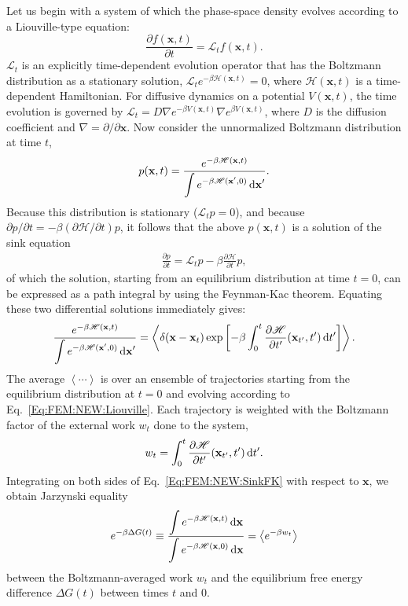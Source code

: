 Let us begin with a system of which the phase-space density evolves according to a Liouville-type equation:
\begin{equation}
	\frac{\partial f(\mathbf{x},t)}{\partial t}=\mathscr{L}_tf(\mathbf{x},t).
	\label{Eq:FEM:NEW:Liouville}
\end{equation}
$\mathscr{L}_t$ is an explicitly time-dependent evolution operator that has the Boltzmann distribution as a stationary solution, $\mathscr{L}_t e^{-\beta \mathscr{H}(\mathbf{x},t)}=0$, where $\mathscr{H}(\mathbf{x},t)$ is a time-dependent Hamiltonian. For diffusive dynamics on a potential $V(\mathbf{x},t)$, the time evolution is governed by $\mathscr{L}_t=D\nabla e^{-\beta V(\mathbf{x},t)}\nabla e^{\beta V(\mathbf{x},t)}$, where $D$ is the diffusion coefficient and $\nabla=\partial/\partial \mathbf{x}$. Now consider the unnormalized Boltzmann distribution at time $t$,
\begin{align}
	p(\mathbf{x},t)=\frac{e^{-\beta \mathscr{H}(\mathbf{x},t)}}{\displaystyle\int e^{-\beta \mathscr{H}(\mathbf{x}^\prime,0)} \mathop{}\!\mathrm{d}\mathbf{x}^\prime}.
\end{align}
Because this distribution is stationary ($\mathscr{L}_tp=0$), and because $\partial p/\partial t=-\beta(\partial \mathscr{H}/\partial t)p$, it follows that the above $p(\mathbf{x},t)$ is a solution of the sink equation
\begin{align}
	\frac{\partial p}{\partial t}=\mathscr{L}_tp-\beta\frac{\partial \mathscr{H}}{\partial t}p,
\end{align}
of which the solution, starting from an equilibrium distribution at time $t=0$, can be expressed as a path integral by using the Feynman-Kac theorem. Equating these two differential solutions immediately gives:
\begin{equation}
	\frac{e^{-\beta\mathscr{H}(\mathbf{x},t)}}{\displaystyle\int e^{-\beta \mathscr{H}(\mathbf{x}^\prime,0)} \mathop{}\!\mathrm{d} \mathbf{x}^\prime}=\left\langle \delta(\mathbf{x}-\mathbf{x}_t)\exp{\left[-\beta\int_0^t\frac{\partial \mathscr{H}}{\partial t^\prime}(\mathbf{x}_{t^{\prime}},t^{\prime})\mathop{}\!\mathrm{d}t^\prime\right]}\right\rangle.
	\label{Eq:FEM:NEW:SinkFK}
\end{equation}
The average $\left\langle \cdots \right\rangle$ is over an ensemble of trajectories starting from the equilibrium distribution at $t=0$ and evolving according to Eq.~\ref{Eq:FEM:NEW:Liouville}. Each trajectory is weighted with the Boltzmann factor of the external work $w_t$ done to the system,
\begin{equation}
	w_t=\int_0^t\frac{\partial \mathscr{H}}{\partial t^\prime}(\mathbf{x}_{t^{\prime}},t^{\prime})\mathop{}\!\mathrm{d} t^\prime.
\end{equation}
Integrating on both sides of Eq.~\ref{Eq:FEM:NEW:SinkFK} with respect to $\mathbf{x}$, we obtain Jarzynski equality
\begin{equation}
	e^{-\beta \Delta G(t)}\equiv \frac{\displaystyle\int e^{-\beta\mathscr{H}(\mathbf{x},t)}\mathop{}\!\mathrm{d} \mathbf{x}}{\displaystyle\int e^{-\beta \mathscr{H}(\mathbf{x},0)} \mathop{}\!\mathrm{d} \mathbf{x}}=\left \langle e^{-\beta w_t}\right\rangle
\end{equation}
between the Boltzmann-averaged work $w_t$ and the equilibrium free energy difference $\Delta G(t)$ between times $t$ and $0$.

